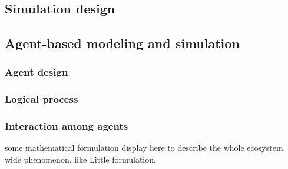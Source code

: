 
\subsection{Simulation design} %
\label{sub:simulation_design}


\subsection{Agent-based modeling and simulation} %
\label{sub:agent_based_modeling_and_simulation}
\subsubsection{Agent design}

\subsubsection{Logical process}

\subsubsection{Interaction among agents}
some mathematical formulation display here to describe the whole ecosystem wide phenomenon, like Little formulation.


